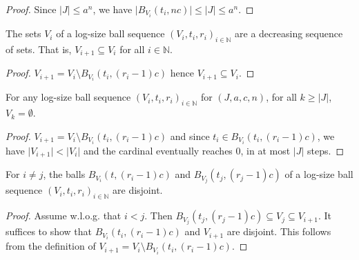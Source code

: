 \begin{proof}
\leanok
Since $|J| \le a^n$, we have $\vert B_{V_i}(t_i, n c) \vert \le \vert J \vert \le a^{n}$.
\end{proof}


\begin{lemma}\label{lem:logSizeBallSequence_V_anti}
  \mathlibok
The sets $V_i$ of a log-size ball sequence $(V_i, t_i, r_i)_{i \in \mathbb{N}}$ are a decreasing sequence of sets. That is, $V_{i+1} \subseteq V_i$ for all $i \in \mathbb{N}$.
\end{lemma}

\begin{proof}
\leanok
$V_{i+1} = V_i \setminus B_{V_i}(t_i, (r_i - 1)c)$ hence $V_{i+1} \subseteq V_i$.
\end{proof}


\begin{lemma}\label{lem:logSizeBallSequence_eq_zero}
  \mathlibok
For any log-size ball sequence $(V_i, t_i, r_i)_{i \in \mathbb{N}}$ for $(J, a, c, n)$, for all $k \ge \vert J \vert$, $V_k = \emptyset$.
\end{lemma}

\begin{proof}
  \leanok
$V_{i+1} = V_i \setminus B_{V_i}(t_i, (r_i - 1)c)$ and since $t_i \in B_{V_i}(t_i, (r_i - 1)c)$, we have $\vert V_{i+1} \vert < \vert V_i \vert$ and the cardinal eventually reaches $0$, in at most $\vert J \vert$ steps.
\end{proof}


\begin{lemma}\label{lem:logSizeBallSequence_disjoint_B}
  \mathlibok
For $i \ne j$, the balls $B_{V_i}(t, (r_i-1)c)$ and $B_{V_j}(t_j, (r_j-1)c)$ of a log-size ball sequence $(V_i, t_i, r_i)_{i \in \mathbb{N}}$ are disjoint.
\end{lemma}

\begin{proof}
  \leanok
Assume w.l.o.g. that $i < j$.
Then $B_{V_j}(t_j, (r_j-1)c) \subseteq V_j \subseteq V_{i+1}$.
It suffices to show that $B_{V_i}(t_i, (r_i-1)c)$ and $V_{i+1}$ are disjoint.
This follows from the definition of $V_{i+1} = V_i \setminus B_{V_i}(t_i, (r_i-1)c)$.
\end{proof}


